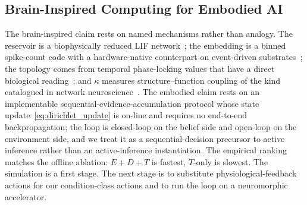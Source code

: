 \documentclass[journal]{IEEEtran}
\begin{document}
\subsection{Brain-Inspired Computing for Embodied AI}
The brain-inspired claim rests on named mechanisms rather than analogy. The reservoir is a biophysically reduced LIF network~\cite{hodgkin1952quantitative,maass2002liquid}; the embedding is a binned spike-count code with a hardware-native counterpart on event-driven substrates~\cite{diehl2015unsupervised}; the topology comes from temporal phase-locking values that have a direct biological reading~\cite{lachaux1999plv,bullmore2009complex}; and $\kappa$ measures structure--function coupling of the kind catalogued in network neuroscience~\cite{honey2009structural,park2013structural,suarez2020linking}. The embodied claim rests on an implementable sequential-evidence-accumulation protocol whose state update~\eqref{eq:dirichlet_update} is on-line and requires no end-to-end backpropagation; the loop is closed-loop on the belief side and open-loop on the environment side, and we treat it as a sequential-decision precursor to active inference rather than an active-inference instantiation. The empirical ranking matches the offline ablation: $E+D+T$ is fastest, $T$-only is slowest. The simulation is a first stage. The next stage is to substitute physiological-feedback actions for our condition-class actions and to run the loop on a neuromorphic accelerator.
\end{document}
